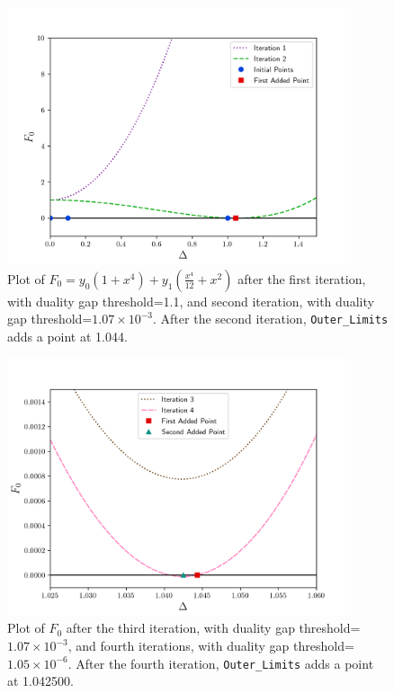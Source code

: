\documentclass[12pt]{article}
\numberwithin{equation}{section}
\begin{document}
\pagebreak

\begin{figure}
\begin{center}
\includegraphics[width=0.9\textwidth]{outer_plots_1}
\end{center}
\caption{Plot of $F_{0}=y_{0}\left(1+x^4\right) + y_{1}\left(\frac{x^4}{12} + x^2\right)$
  after the first iteration, with duality gap threshold=1.1, and second
  iteration, with duality gap threshold=$1.07\times10^{-3}$.  After the second
  iteration, \texttt{Outer\_Limits} adds a point at 1.044.}
\label{fig:plot1}
\end{figure}

\begin{figure}
\begin{center}
\includegraphics[width=0.9\textwidth]{outer_plots_2}
\end{center}
\caption{Plot of $F_{0}$
  after the third iteration, with duality gap threshold=$1.07\times10^{-3}$, and fourth iterations, with duality gap threshold=$1.05\times10^{-6}$.  After the fourth
  iteration, \texttt{Outer\_Limits} adds a point at 1.042500.}
\label{fig:plot2}
\end{figure}
\end{document}

